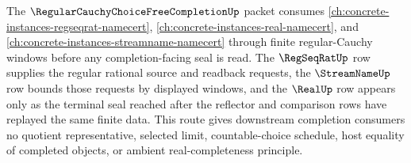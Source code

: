 The $\RegularCauchyChoiceFreeCompletionUp$ packet consumes \autoref{ch:concrete-instances-regseqrat-namecert}, \autoref{ch:concrete-instances-real-namecert}, and \autoref{ch:concrete-instances-streamname-namecert} through finite regular-Cauchy windows before any completion-facing seal is read. The $\RegSeqRatUp$ row supplies the regular rational source and readback requests, the $\StreamNameUp$ row bounds those requests by displayed windows, and the $\RealUp$ row appears only as the terminal seal reached after the reflector and comparison rows have replayed the same finite data. This route gives downstream completion consumers no quotient representative, selected limit, countable-choice schedule, host equality of completed objects, or ambient real-completeness principle.
